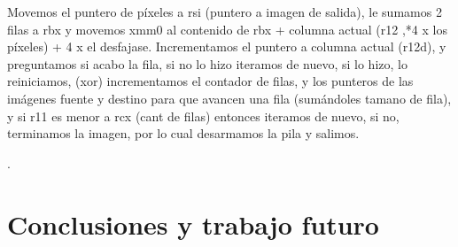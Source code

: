 \documentclass[a4paper]{article}
\begin{document}
  \hfill \break
  Movemos el puntero de píxeles a rsi (puntero a imagen de salida), le sumamos 2 filas a rbx y movemos xmm0 al contenido de rbx + columna actual (r12 ,*4 x los píxeles) + 4 x el desfajase. 
  \hfill \break
  Incrementamos el puntero a  columna actual (r12d), y preguntamos si acabo la fila, si no lo hizo iteramos de nuevo, si lo hizo, lo reiniciamos, (xor) incrementamos el contador de filas, y  los punteros de las imágenes fuente y destino para que avancen una fila (sumándoles tamano de fila), y si r11 es menor a rcx (cant de filas) entonces iteramos de nuevo, si no, terminamos la imagen, por lo cual desarmamos la pila y salimos. 
 \hfill \break
 

 







 
 

  
 

    
   
 
 
 
    	
	  
	
	 
	 
	
	
	   
		
	
	
	.
	
	
	
	
	 

	
	
	  



\section{Conclusiones y trabajo futuro}
\end{document}
